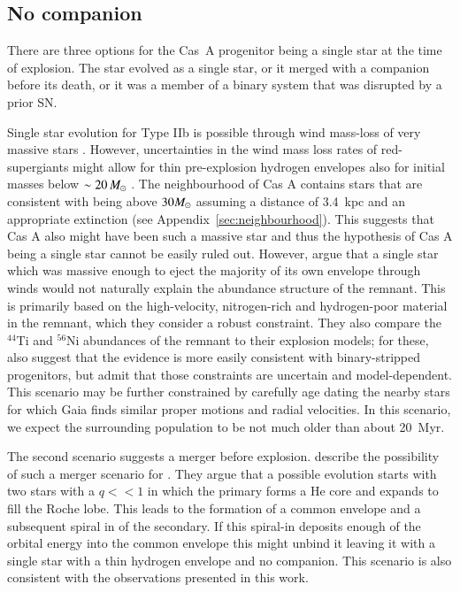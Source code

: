 \documentclass{aa}
\begin{document}



\subsection{No companion}
There are three options for the Cas~A progenitor being a single star at the time of explosion. The star evolved as a single star, or it merged with a companion before its death, or it was a member of a binary system that was disrupted by a prior SN.

Single star evolution for Type IIb is possible through wind mass-loss of very massive stars \citep[see the review by][]{2007ARA&A..45..177C}. However, uncertainties in the wind mass loss rates of red-supergiants might allow for thin pre-explosion hydrogen envelopes also for initial masses below $\sim20\,\hbox{$M_{\odot}$}$ \citep[][]{2010ApJ...717L..62Y, 2017A&A...603A.118R}. The neighbourhood of Cas A contains stars that are consistent with being above $30\hbox{$M_{\odot}$}$ assuming a distance of 3.4~kpc and an appropriate extinction (see Appendix~\ref{sec:neighbourhood}). This suggests that Cas A also might have been such a massive star and thus the hypothesis of Cas A being a single star cannot be easily ruled out. However, \citet{2006ApJ...640..891Y} argue that a single star which was massive enough to eject the majority of its own envelope through winds would not naturally explain the abundance structure of the remnant.  This is primarily based on the high-velocity, nitrogen-rich and hydrogen-poor material in the remnant, which they consider a robust constraint. They also compare the $^{44}$Ti and $^{56}$Ni abundances of the remnant to their explosion models; for these, \citet{2006ApJ...640..891Y} also suggest that the evidence is more easily consistent with binary-stripped progenitors, but admit that those constraints are uncertain and model-dependent. This scenario may be further constrained by carefully age dating the nearby stars for which Gaia finds similar proper motions and radial velocities. In this scenario, we expect the surrounding population to be not much older than about 20~Myr.

The second scenario suggests a merger before explosion. \citet[][]{1995PhR...256..173N} describe the possibility of such a merger scenario for  \citep[9 years before the binary companion was identified in ][]{2004Natur.427..129M}. They argue that a possible evolution starts with two stars with a $q<<1$ in which the primary forms a He core and expands to fill the Roche lobe. This leads to the formation of a common envelope and a subsequent spiral in of the secondary. If this spiral-in deposits enough of the orbital energy into the common envelope this might unbind it leaving it with a single star with a thin hydrogen envelope and no companion. This scenario is also consistent with the observations presented in this work.
\end{document}
